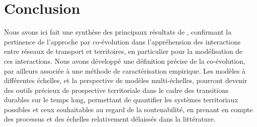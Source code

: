 \documentclass[11pt]{article}
\begin{document}
\section{Conclusion}

Nous avons ici fait une synthèse des principaux résultats de \cite{raimbault2018caracterisation}, confirmant la pertinence de l'approche par co-évolution dans l'appréhension des interactions entre réseaux de transport et territoires, en particulier pour la modélisation de ces interactions. Nous avons développé une définition précise de la co-évolution, par ailleurs associée à une méthode de caractérisation empirique. Les modèles à différentes échelles, et la perspective de modèles multi-échelles, pourront devenir des outils précieux de prospective territoriale dans le cadre des transitions durables sur le temps long, permettant de quantifier les systèmes territoriaux possibles et ceux souhaitables au regard de la soutenabilité, en prenant en compte des processus et des échelles relativement délaissés dans la littérature.









\end{document}

